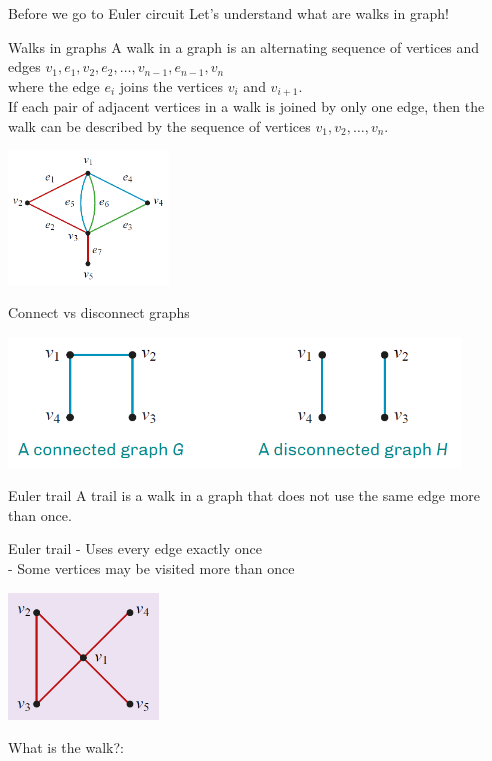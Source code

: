 \documentclass[
	11pt, %
]{beamer}
\begin{document}
\begin{frame}{Before we go to Euler circuit}
    Let's understand what are walks in graph!
    \begin{block}{Walks in graphs}
        A walk in a graph is an alternating sequence of vertices and edges
        $v_1, e_1, v_2, e_2,\ldots , v_{n-1}, e_{n-1}, v_n$\\
        where the edge $e_i$ joins the vertices $v_i$ and $v_{i+1}$.\\
        \bigskip
        If each pair of adjacent vertices in a walk is joined by only one edge, then the walk can be described by the sequence of vertices $v_1, v_2,\ldots,v_n$.\\
        \begin{center}
            \includegraphics[width = 4.25cm]{Walk.png}
        \end{center}
    \end{block}
\end{frame}

\begin{frame}{Connect vs disconnect graphs}
    \begin{center}
        \includegraphics[width = 12cm]{Connect.png}
    \end{center}
\end{frame}

\begin{frame}{Euler trail}
    A trail is a walk in a graph that does not use the same edge more than once. 
    \begin{block}{Euler trail}
       - Uses every edge exactly once\\
       - Some vertices may be visited more than once
        \begin{center}
            \includegraphics[width = 4cm]{Trail.png}
        \end{center}
        What is the walk?:
    \end{block}
\end{frame}
\end{document}
